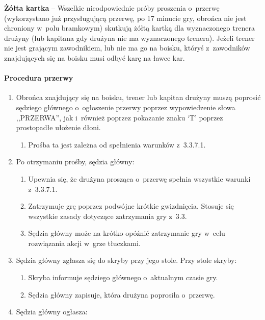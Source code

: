 \documentclass[12pt,a4paper]{article}
\newcommand\yellowcard[1]{\bgroup\textcolor{darkyellow}{\textbf{#1}}}
\begin{document}
\yellowcard{Żółta kartka} -- Wszelkie nieodpowiednie próby proszenia o~przerwę
(wykorzystano już przysługującą przerwę, po 17 minucie gry, obrońca nie jest chroniony w~polu bramkowym) skutkują żółtą kartką dla
wyznaczonego trenera drużyny (lub kapitana gdy drużyna nie ma wyznaczonego trenera). Jeżeli trener nie jest grającym
zawodnikiem, lub nie ma go na boisku, któryś z~zawodników znajdujących
się na boisku musi odbyć karę na ławce kar.

\paragraph{Procedura przerwy}

\begin{enumerate}
	\item
	      Obrońca znajdujący się na boisku, trener lub kapitan drużyny muszą
	      poprosić sędziego głównego o~ogłoszenie przerwy poprzez wypowiedzenie
	      słowa ,,PRZERWA'', jak i~również poprzez pokazanie znaku `T' poprzez
	      prostopadłe ułożenie dłoni.

	      \begin{enumerate}
		      \item
		            Prośba ta jest zależna od spełnienia warunków z~3.3.7.1.
	      \end{enumerate}
	\item
	      Po otrzymaniu prośby, sędzia główny:

	      \begin{enumerate}
		      \item
		            Upewnia się, że drużyna prosząca o~przerwę spełnia wszystkie warunki
		            z~3.3.7.1.
		      \item
		            Zatrzymuje grę poprzez podwójne krótkie gwizdnięcia. Stosuje się
		            wszystkie zasady dotyczące zatrzymania gry z~3.3.
		      \item
		            Sędzia główny może na krótko opóźnić zatrzymanie gry w~celu
		            rozwiązania akcji w~grze tłuczkami.
	      \end{enumerate}
	\item
	      Sędzia główny zgłasza się do skryby przy jego stole. Przy stole
	      skryby:

	      \begin{enumerate}
		      \item
		            Skryba informuje sędziego głównego o~aktualnym czasie gry.
		      \item
		            Sędzia główny zapisuje, która drużyna poprosiła o~przerwę.
	      \end{enumerate}
	\item
	      Sędzia główny ogłasza:


\end{enumerate}
\end{document}
